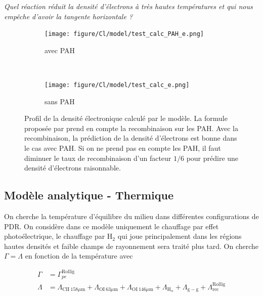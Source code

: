 \textit{Quel réaction réduit la densité d'électrons à très hautes températures et qui nous empêche d'avoir la tangente horizontale ?}


\begin{figure}[htbp]
    \centering
    \begin{subfigure}[t]{0.45\textwidth} %
        \centering \texttt{[image: figure/Cl/model/test\_calc\_PAH\_e.png]}
        \caption{avec PAH}
    \end{subfigure}
    ~ 
    \begin{subfigure}[t]{0.45\textwidth}
        \centering \texttt{[image: figure/Cl/model/test\_calc\_e.png]}
        \caption{sans PAH}
    \end{subfigure}
    \caption{Profil de la densité électronique calculé par le modèle. La formule proposée par \cite{Weingartner_2001} prend en compte la recombinaison sur les PAH. Avec la recombinaison, la prédiction de la densité d'électrons est bonne dans le cas avec PAH. Si on ne prend pas en compte les PAH, il faut diminuer le taux de recombinaison d'un facteur $1/6$ pour prédire une densité d'électrons raisonnable.}
    \label{fig:Cl:model:rec}
\end{figure}



\subsection{Modèle analytique - Thermique}

On cherche la température d'équilibre du milieu dans différentes configurations de PDR. On considère dans ce modèle uniquement le chauffage par effet photoélectrique, le chauffage par $\mathrm{H}_2$ qui joue principalement dans les régions hautes densités et faible champs de rayonnement sera traité plus tard. On cherche $\Gamma = \Lambda $ en fonction de la température avec

\begin{equation}
    \begin{split}
        \Gamma &= \Gamma_{pe}^{\mathrm{Rollïg}} \\
        \Lambda &=   \Lambda_{\mathrm{CII}\ 158 \mu \mathrm{m}} + \Lambda_{\mathrm{OI}\ 63 \mu \mathrm{m}} + \Lambda_{\mathrm{OI}\ 146 \mu \mathrm{m}}  + \Lambda_{\mathrm{H}_\alpha} + \Lambda_{\mathrm{g}-\mathrm{g}} + \Lambda_{\mathrm{rec}}^{\mathrm{Rollïg}}
    \end{split}
\end{equation}



